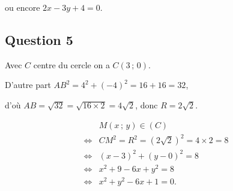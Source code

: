 \documentclass[10pt]{article}
\begin{document}
ou encore \( 2x - 3y + 4 = 0 \).

\subsection*{Question 5}

Avec \(C\) centre du cercle on a \( C(3 \,;\, 0) \).

D'autre part \(AB^2 = 4^2 + (-4)^2 = 16 + 16 = 32\),

d'où \(AB = \sqrt{32} = \sqrt{16 \times 2} = 4\sqrt{2}\), donc \(R = 2\sqrt{2}\).

\begin{align*}
&M(x \,;\, y) \in (C) \\
\iff &CM^2 = R^2 = (2\sqrt{2})^2 = 4 \times 2 = 8 \\
\iff &(x - 3)^2 + (y - 0)^2 = 8 \\
\iff &x^2 + 9 - 6x + y^2 = 8 \\
\iff &x^2 + y^2 - 6x + 1 = 0.
\end{align*}
\end{document}
